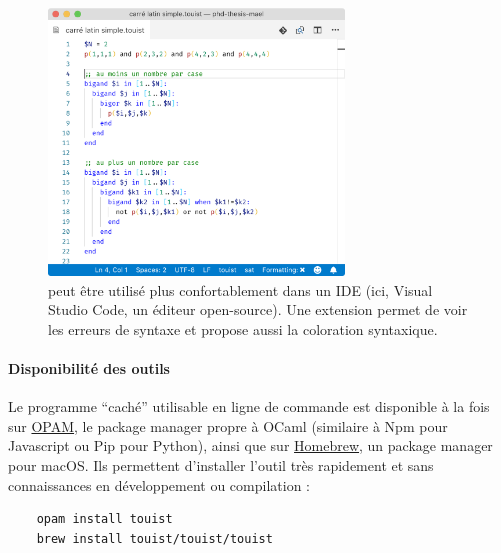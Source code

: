 \begin{figure}[!ht] \centering
  \includegraphics[width=0.7\textwidth]{figures/vscode-touist-white}
  \caption{\touist peut être utilisé plus confortablement dans un IDE (ici, Visual Studio Code, un éditeur open-source). Une extension permet de voir les erreurs de syntaxe et propose aussi la coloration syntaxique.} \label{fig:touist-vscode}
\end{figure}

\paragraph{Disponibilité des outils}

Le programme \enquote{caché} utilisable en ligne de commande est disponible à la fois sur \href{https://opam.ocaml.org/packages/touist}{OPAM}, le package manager propre à OCaml (similaire à Npm pour Javascript ou Pip pour Python), ainsi que sur \href{https://github.com/touist/homebrew-touist}{Homebrew}, un package manager pour macOS. Ils permettent d'installer l'outil très rapidement et sans connaissances en développement ou compilation :

\begin{verbatim}
    opam install touist
    brew install touist/touist/touist
\end{verbatim}